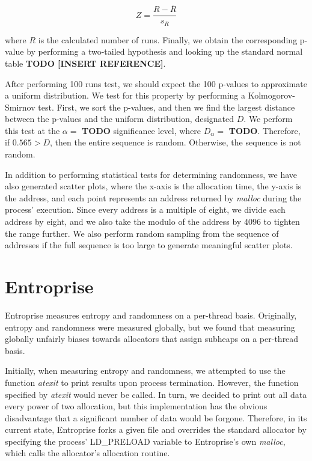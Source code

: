 \documentclass[11pt]{article}
\begin{document}
\begin{multicols*}{2}
\[ Z = \frac{R - \bar{R}}{s_R} \]

\noindent where \( R \) is the calculated number of runs.
Finally, we obtain the corresponding p-value by performing a two-tailed hypothesis and looking up the standard normal table \textbf{TODO [INSERT REFERENCE]}.

After performing 100 runs test, we should expect the 100 p-values to approximate a uniform distribution. 
We test for this property by performing a Kolmogorov-Smirnov test. 
First, we sort the p-values, and then we find the largest distance between the p-values and the uniform distribution, designated \( D \).
We perform this test at the \(\alpha = \) \textbf{TODO} significance level, where \( D_\alpha = \) \textbf{TODO}.
Therefore, if \( 0.565 > D \), then the entire sequence is random. Otherwise, the sequence is not random.

In addition to performing statistical tests for determining randomness, we have also generated scatter plots, where the x-axis is the allocation time, the y-axis is the address, and each point represents an address returned by \textit{malloc} during the process' execution. 
Since every address is a multiple of eight, we divide each address by eight, and we also take the modulo of the address by 4096 to tighten the range further. 
We also perform random sampling from the sequence of addresses if the full sequence is too large to generate meaningful scatter plots.

\section{Entroprise}

\noindent Entroprise measures entropy and randomness on a per-thread basis. 
Originally, entropy and randomness were measured globally, but we found that measuring globally unfairly biases towards allocators that assign subheaps on a per-thread basis.

Initially, when measuring entropy and randomness, we attempted to use the function \textit{atexit} to print results upon process termination.
However, the function specified by \textit{atexit} would never be called.
In turn, we decided to print out all data every power of two allocation, but this implementation has the obvious disadvantage that a significant number of data would be forgone.
Therefore, in its current state, Entroprise forks a given file and overrides the standard allocator by specifying the process' LD\_PRELOAD variable to Entroprise's own \textit{malloc}, which calls the allocator's allocation routine.


\end{multicols*}
\end{document}
